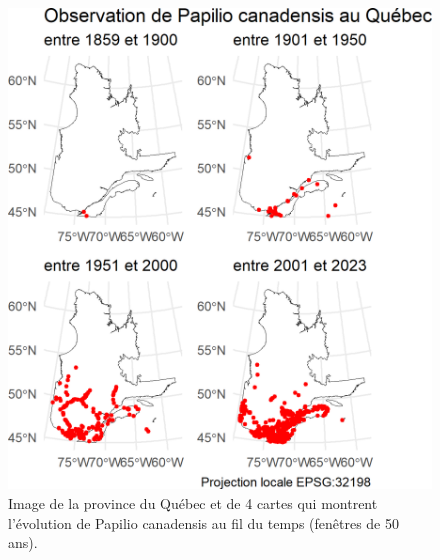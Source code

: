 \documentclass[9pt,twocolumn,twoside,]{pnas-new}
\begin{document}
\begin{figure}

\includegraphics[width=1\linewidth]{cartes_pcanadensis} \hfill{}

\caption{Image de la province du Québec et de 4 cartes qui montrent l'évolution de Papilio canadensis au fil du temps (fenêtres de 50 ans).}\label{fig:fig_cartes_pcanadensis, fullpage-figure}
\end{figure}
\end{document}
